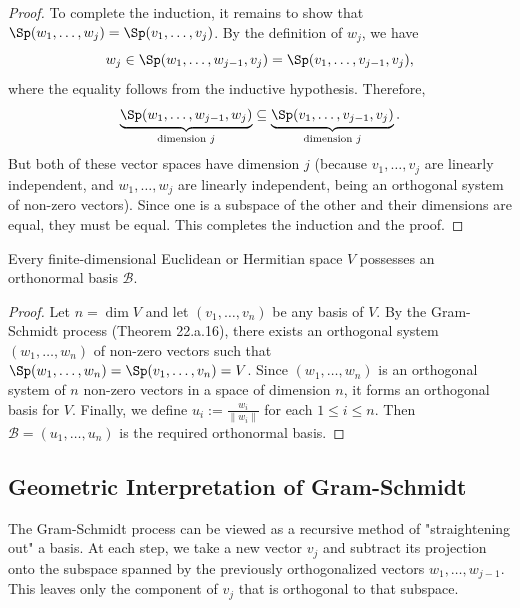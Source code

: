 \begin{proof}
    To complete the induction, it remains to show that $\Sp(w_1, \dots, w_j) = \Sp(v_1, \dots, v_j)$. By the definition of $w_j$, we have
    \begin{equation*}
        w_j \in \Sp(w_1, \dots, w_{j-1}, v_j) = \Sp(v_1, \dots, v_{j-1}, v_j),
    \end{equation*}
    where the equality follows from the inductive hypothesis. Therefore,
    \begin{equation*}
        \underbrace{\Sp(w_1, \dots, w_{j-1}, w_j)}_{\text{dimension } j} \subseteq \underbrace{\Sp(v_1, \dots, v_{j-1}, v_j)}_{\text{dimension } j}.
    \end{equation*}
    But both of these vector spaces have dimension $j$ (because $v_1, \dots, v_j$ are linearly independent, and $w_1, \dots, w_j$ are linearly independent, being an orthogonal system of non-zero vectors). Since one is a subspace of the other and their dimensions are equal, they must be equal. This completes the induction and the proof.
\end{proof}

\begin{corollary}
    Every finite-di\-men\-sional Euclidean or Hermitian space $V$ possesses an orthonormal basis $\mathcal{B}$.
\end{corollary}

\begin{proof}
    Let $n = \dim V$ and let $(v_1, \dots, v_n)$ be any basis of $V$. By the Gram-Schmidt process (Theorem 22.a.16), there exists an orthogonal system $(w_1, \dots, w_n)$ of non-zero vectors such that $\Sp(w_1, \dots, w_n) = \Sp(v_1, \dots, v_n) = V$.
    Since $(w_1, \dots, w_n)$ is an orthogonal system of $n$ non-zero vectors in a space of dimension $n$, it forms an orthogonal basis for $V$.
    Finally, we define $u_i := \frac{w_i}{\|w_i\|}$ for each $1 \leq i \leq n$. Then $\mathcal{B} = (u_1, \dots, u_n)$ is the required orthonormal basis.
\end{proof}

\subsection{Geometric Interpretation of Gram-Schmidt}

The Gram-Schmidt process can be viewed as a recursive method of "straightening out" a basis. At each step, we take a new vector $v_j$ and subtract its projection onto the subspace spanned by the previously orthogonalized vectors $w_1, \dots, w_{j-1}$. This leaves only the component of $v_j$ that is orthogonal to that subspace.

